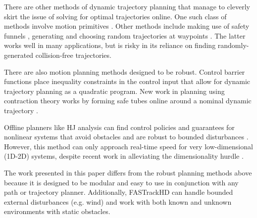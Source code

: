 There are other methods of dynamic trajectory planning that manage to cleverly skirt the issue of solving for optimal trajectories online.  One such class of methods involve motion primitives \cite{Gillula2010, Dey2016}. Other methods include making use of safety funnels \cite{Majumdar2016},  generating and choosing random trajectories at waypoints \cite{Kalakrishnan2011, Schwesinger2013}. The latter works well in many applications, but is risky in its reliance on finding randomly-generated collision-free trajectories. 

There are also motion planning methods designed to be robust. Control barrier functions \cite{Xu2015, Ames2014} place inequality constraints in the control input that allow for dynamic trajectory planning as a quadratic program. New work in planning using contraction theory works by forming safe tubes online around a nominal dynamic trajectory \cite{Singh2017}.

Offline planners like HJ analysis can find control policies and guarantees for nonlinear systems that avoid obstacles and are robust to bounded disturbances \cite{Mitchell05}.  However, this method can only approach real-time speed for very low-dimensional (1D-2D) systems, despite recent work in alleviating the dimensionality hurdle \cite{Chen2016a, Chen2016b}.

The work presented in this paper differs from the robust planning methods above because it is designed to be modular and easy to use in conjunction with any path or trajectory planner. Additionally, FASTrackHD can handle bounded external disturbances (e.g. wind) and work with both known and unknown environments with static obstacles. 